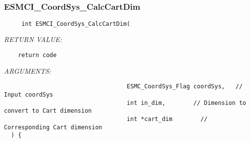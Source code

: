  
\setlength{\oldparskip}{\parskip}
\setlength{\parskip}{1.5ex}
\setlength{\oldparindent}{\parindent}
\setlength{\parindent}{0pt}
\setlength{\oldbaselineskip}{\baselineskip}
\setlength{\baselineskip}{11pt}
 
\def\bv{\begin{verbatim}}
\def\ev{\end{verbatim}}
\def\be{\begin{equation}}
\def\ee{\end{equation}}
\def\bea{\begin{eqnarray}}
\def\eea{\end{eqnarray}}
\def\bi{\begin{itemize}}
\def\ei{\end{itemize}}
\def\bn{\begin{enumerate}}
\def\en{\end{enumerate}}
\def\bd{\begin{description}}
\def\ed{\end{description}}
\def\({\left (}
\def\){\right )}
\def\[{\left [}
\def\]{\right ]}
\def\<{\left  \langle}
\def\>{\right \rangle}
\def\cI{{\cal I}}
\def\diag{\mathop{\rm diag}}
\def\tr{\mathop{\rm tr}}


 

  
 
\mbox{}\hrulefill\
 
\subsubsection [ESMCI\_CoordSys\_CalcCartDim] {ESMCI\_CoordSys\_CalcCartDim}


  
\begin{verbatim}     int ESMCI_CoordSys_CalcCartDim(\end{verbatim}{\em RETURN VALUE:}
\begin{verbatim}    return code
   \end{verbatim}{\em ARGUMENTS:}
\begin{verbatim}                                   ESMC_CoordSys_Flag coordSys,   // Input coordSys
                                   int in_dim,        // Dimension to convert to Cart dimension
                                   int *cart_dim        // Corresponding Cart dimension
  ) {\end{verbatim}
 
